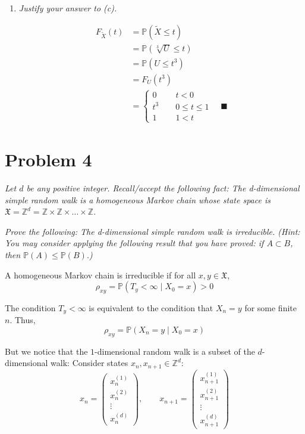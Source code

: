\documentclass[12pt]{article}
\renewcommand{\P}{\mathbb{P}}
\newcommand{\Z}{\mathbb{Z}}
\newcommand{\qed}{\quad \blacksquare}
\newcommand{\mfX}{\mathfrak{X}}
\begin{document}
\begin{enumerate}[label=(\alph*)]
    \item \emph{Justify your answer to (c).}
    
        \color{blue}
            \begin{align*}
                F_{\tilde X}(t) &= \P(\tilde X \leq t)\\
                &= \P(\sqrt[3]{U} \leq t)\\
                &= \P(U \leq t^3)\\
                &= F_U(t^3)\\
                &= \begin{cases}
                    0 \qquad \;t < 0\\
                    t^3 \qquad 0 \leq t \leq 1\\
                    1 \qquad \;1 < t 
                \end{cases}\qed
            \end{align*}
        \color{black}

\end{enumerate}
\pagebreak

\section*{Problem 4}
\emph{ Let $d$ be any positive integer. Recall/accept the following fact: The d-dimensional simple random walk is a homogeneous Markov chain whose state space is $\mfX = \Z^d = \Z \times \Z \times \dots \times \Z$.}

\emph{Prove the following: The d-dimensional simple random walk is irreducible.
(Hint: You may consider applying the following result that you have proved: if $A \subset B$, then $\P(A) \leq \P(B)$.)}

    \color{blue}
        A homogeneous Markov chain is irreducible if for all $x, y \in \mfX$, 
        \[\rho_{xy} = \P(T_y < \infty \; | \; X_0 = x) > 0\]

        The condition $T_y < \infty$ is equivalent to the condition that $X_n = y$ for some finite $n$. Thus, 
        \[\rho_{xy} = \P(X_n = y \; | \; X_0 = x)\]
    
        But we notice that the $1$-dimensional random walk is a subset of the $d$-dimensional walk: Consider states $x_{n}, x_{n+1} \in \Z^d$: 
        \[x_n = \begin{pmatrix}
            x_n^{(1)}\\
            x_n^{(2)}\\
            \vdots\\
            x_n^{(d)}
        \end{pmatrix}, \qquad x_{n+1} = \begin{pmatrix}
            x_{n+1}^{(1)}\\
            x_{n+1}^{(2)}\\
            \vdots\\
            x_{n+1}^{(d)}
        \end{pmatrix}\]
\end{document}

